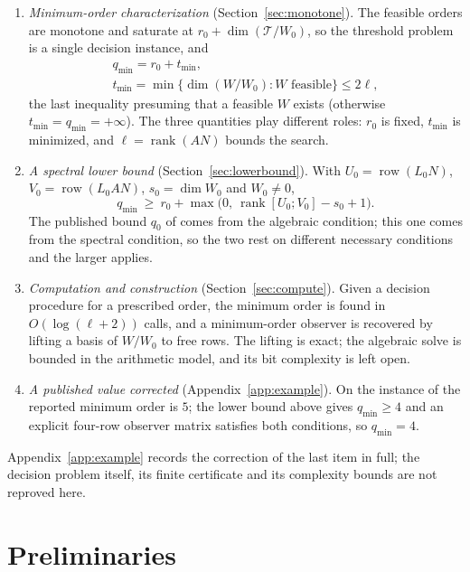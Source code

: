 ﻿\documentclass[journal]{IEEEtran}
\theoremstyle{plainn}
\theoremstyle{remark}
\begin{document}
\begin{enumerate}
\item \emph{Minimum-order characterization} (Section~\ref{sec:monotone}). The feasible orders are
monotone and saturate at $r_0+\dim(\mathcal T/W_0)$, so the threshold problem is a single decision
instance, and
\begin{equation*}
\begin{gathered}
q_{\min}=r_0+t_{\min},\\
t_{\min}=\min\{\dim(W/W_0):W\text{ feasible}\}\le2\ell ,
\end{gathered}
\end{equation*}
the last inequality presuming that a feasible $W$ exists (otherwise $t_{\min}=q_{\min}=+\infty$).
The three quantities play different roles: $r_0$ is fixed, $t_{\min}$ is minimized, and
$\ell=\operatorname{rank}(AN)$ bounds the search.
\item \emph{A spectral lower bound} (Section~\ref{sec:lowerbound}). With
$U_0=\operatorname{row}(L_0N)$, $V_0=\operatorname{row}(L_0AN)$, $s_0=\dim W_0$ and $W_0\neq0$,
\begin{equation*}
q_{\min}\ \ge\ r_0+\max\bigl(0,\ \operatorname{rank}[U_0;V_0]-s_0+1\bigr).
\end{equation*}
The published bound $q_0$ of \cite{fer26a,fer26b} comes from the algebraic condition; this one comes
from the spectral condition, so the two rest on different necessary conditions and the larger applies.
\item \emph{Computation and construction} (Section~\ref{sec:compute}). Given a decision procedure for
a prescribed order, the minimum order is found in $O(\log(\ell+2))$ calls, and a minimum-order observer is
recovered by lifting a basis of $W/W_0$ to free rows. The lifting is exact; the algebraic solve is
bounded in the arithmetic model, and its bit complexity is left open.
\item \emph{A published value corrected} (Appendix~\ref{app:example}). On the instance of
\cite[Sec.~VII]{fer26b} the reported minimum order is $5$; the lower bound above gives
$q_{\min}\ge4$ and an explicit four-row observer matrix satisfies both conditions, so
$q_{\min}=4$.
\end{enumerate}

Appendix~\ref{app:example} records the correction of the last item in full; the decision problem
itself, its finite certificate and its complexity bounds are not reproved here.

\section{Preliminaries}\label{sec:prelim}
\end{document}
